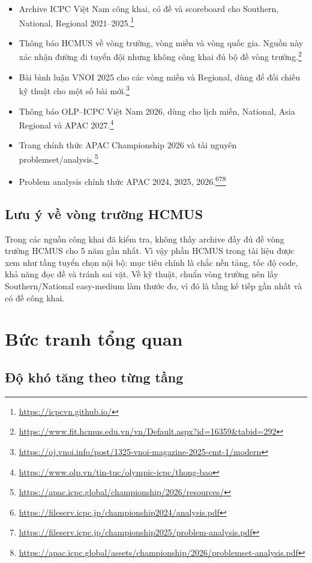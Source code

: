 \documentclass[11pt,a4paper]{article}
\newcommand{\source}[1]{\footnote{\url{#1}}}
\begin{document}
\begin{itemize}
  \item Archive ICPC Việt Nam công khai, có đề và scoreboard cho Southern, National, Regional 2021--2025.\source{https://icpcvn.github.io/}
  \item Thông báo HCMUS về vòng trường, vòng miền và vòng quốc gia. Nguồn này xác nhận đường đi tuyển đội nhưng không công khai đủ bộ đề vòng trường.\source{https://www.fit.hcmus.edu.vn/vn/Default.aspx?id=16359&tabid=292}
  \item Bài bình luận VNOI 2025 cho các vòng miền và Regional, dùng để đối chiếu kỹ thuật cho một số bài mới.\source{https://oj.vnoi.info/post/1325-vnoi-magazine-2025-cmt-1/modern}
  \item Thông báo OLP--ICPC Việt Nam 2026, dùng cho lịch miền, National, Asia Regional và APAC 2027.\source{https://www.olp.vn/tin-tuc/olympic-icpc/thong-bao}
  \item Trang chính thức APAC Championship 2026 và tài nguyên problemset/analysis.\source{https://apac.icpc.global/championship/2026/resources/}
  \item Problem analysis chính thức APAC 2024, 2025, 2026.\source{https://fileserv.icpc.jp/championship2024/analysis.pdf}\source{https://fileserv.icpc.jp/championship2025/problem-analysis.pdf}\source{https://apac.icpc.global/assets/championship/2026/problemset-analysis.pdf}
\end{itemize}

\subsection{Lưu ý về vòng trường HCMUS}

Trong các nguồn công khai đã kiểm tra, không thấy archive đầy đủ đề vòng trường HCMUS cho 5 năm gần nhất. Vì vậy phần HCMUS trong tài liệu được xem như tầng tuyển chọn nội bộ: mục tiêu chính là chắc nền tảng, tốc độ code, khả năng đọc đề và tránh sai vặt. Về kỹ thuật, chuẩn vòng trường nên lấy Southern/National easy-medium làm thước đo, vì đó là tầng kế tiếp gần nhất và có đề công khai.

\section{Bức tranh tổng quan}

\subsection{Độ khó tăng theo từng tầng}
\end{document}
